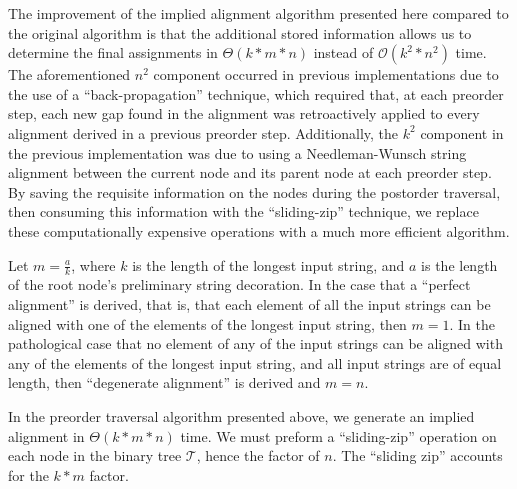 \documentclass[11pt]{article}
\begin{document}
%
%

The improvement of the implied alignment algorithm presented here compared to the original algorithm is that the additional stored information allows us to determine the final assignments in $\Theta(k * m * n)$ instead of $\mathcal{O}(k^2 * n^2)$ time. 
The aforementioned $n^2$ component occurred in previous implementations due to the use of a ``back-propagation'' technique, which required that, at each preorder step, each new gap found in the alignment was retroactively applied to every alignment derived in a previous preorder step.
Additionally, the $k^2$ component in the previous implementation was due to using a Needleman-Wunsch string alignment between the current node and its parent node at each preorder step.
By saving the requisite information on the nodes during the postorder traversal, then consuming this information with the ``sliding-zip'' technique, we replace these computationally expensive operations with a much more efficient algorithm.

Let $m = \frac{a}{k}$, where $k$ is the length of the longest input string, and $a$ is the length of the root node's preliminary string decoration.
In the case that a ``perfect alignment'' is derived, that is, that each element of all the input strings can be aligned with one of the elements of the longest input string, then $m = 1$.
In the pathological case that no element of any of the input strings can be aligned with any of the elements of the longest input string, and all input strings are of equal length, then ``degenerate alignment'' is derived and $m = n$.

In the preorder traversal algorithm presented above, we generate an implied alignment in $\Theta(k * m * n)$ time.
We must preform a ``sliding-zip'' operation on each node in the binary tree $\mathcal{T}$, hence the factor of $n$.
The ``sliding zip'' accounts for the $k * m$ factor.
\end{document}
